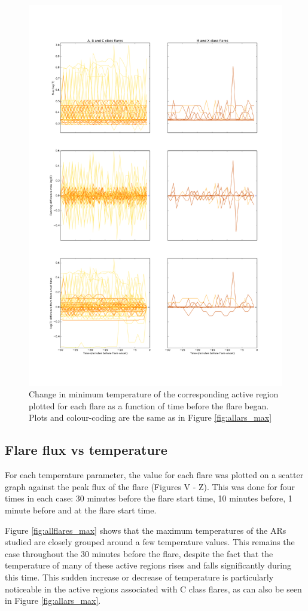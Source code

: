 \documentclass[referee,a4paper,12pt,traditabstract]{swsc}
\begin{document}
\begin{linenumbers}
\begin{figure}
		\includegraphics[width=0.7\columnwidth]{tempplotsmax/allars.png}
	\caption{Change in minimum temperature of the corresponding active region plotted for each flare as a function of time before the flare began. Plots and colour-coding are the same as in Figure \ref{fig:allars_max}}
	\label{fig:allars_min}
\end{figure}

\subsection{Flare flux vs temperature}
For each temperature parameter, the value for each flare was plotted on a scatter graph against the peak flux of the flare (Figures V - Z).
This was done for four times in each case: 30 minutes before the flare start time, 10 minutes before, 1 minute before and at the flare start time.

Figure \ref{fig:allflares_max} shows that the maximum temperatures of the ARs studied are closely grouped around a few temperature values.
This remains the case throughout the 30 minutes before the flare, despite the fact that the temperature of many of these active regions rises and falls significantly during this time.
This sudden increase or decrease of temperature is particularly noticeable in the active regions associated with C class flares, as can also be seen in Figure \ref{fig:allars_max}.


\end{linenumbers}
\end{document}
